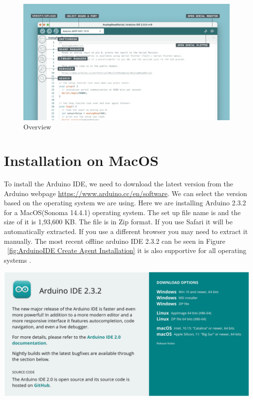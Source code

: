 \begin{figure}
	\begin{center}
		\includegraphics[width=0.7\linewidth]{Images/Arduino/ide-2-overview.png}
		\caption{Overview}
		\label{ide-2-overview}
	\end{center}
\end{figure}

\section{Installation on MacOS}

To install the Arduino IDE, we need to download the latest version from the Arduino webpage \url{https://www.arduino.cc/en/software}. We can select the version based on the operating system we are using. Here we are installing Arduino 2.3.2 for a MacOS(Sonoma 14.4.1) operating system. The set up file name is  and the size of it is 1,93,600 KB. The file is in Zip format. If you use Safari it will be automatically extracted. If you use a different browser you may need to extract it manually. The most recent offline arduino IDE 2.3.2 can be seen in Figure ~\ref{fig:ArduinoIDE Create Agent Installation} it is also supportive for all operating systems \cite{arduino_ide_mac_tutorial:2025}.

\begin{center}
	
	\includegraphics[width=0.7\linewidth]{images/ArduinoIDE/ArduinoIdeCreateAgentInstallation.png}
	\label{fig:ArduinoIDE Create Agent Installation}
\end{center}


